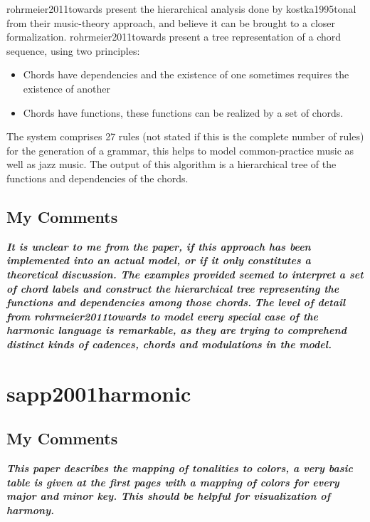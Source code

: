 		rohrmeier2011towards present the hierarchical analysis done by kostka1995tonal from their music-theory approach, and believe it can be brought to a closer formalization. rohrmeier2011towards present a tree representation of a chord sequence, using two principles:

		\begin{itemize}
			\item Chords have dependencies and the existence of one sometimes requires the existence of another
			\item Chords have functions, these functions can be realized by a set of chords.
		\end{itemize}

		The system comprises 27 rules (not stated if this is the complete number of rules) for the generation of a grammar, this helps to model common-practice music as well as jazz music. The output of this algorithm is a hierarchical tree of the functions and dependencies of the chords.

		\subsection{My Comments}
		\emph{\textbf{
			It is unclear to me from the paper, if this approach has been implemented into an actual model, or if it only constitutes a theoretical discussion. The examples provided seemed to interpret a set of chord labels and construct the hierarchical tree representing the functions and dependencies among those chords.
		}}
		\emph{\textbf{
			The level of detail from rohrmeier2011towards to model every special case of the harmonic language is remarkable, as they are trying to comprehend distinct kinds of cadences, chords and modulations in the model.
		}}


	\section{sapp2001harmonic }
		\subsection{My Comments}
			\emph{\textbf{
				This paper describes the mapping of tonalities to colors, a very basic table is given at the first pages with a mapping of colors for every major and minor key. This should be helpful for visualization of harmony.
			}}
